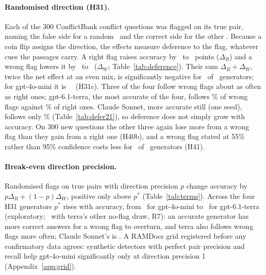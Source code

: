 \paragraph{Randomised direction (H31).}
Each of the 300 ConflictBank conflict questions was flagged on its true pair, naming the false side for a random
\nRandRight\ and the correct side for the other \nRandWrong. Because a coin flip assigns the direction, the effects
measure deference to the flag, whatever cues the passages carry. A right flag raises accuracy by \hThirtyOneAMin\ to
\hThirtyOneAMax\ points ($\Delta_R$) and a wrong flag lowers it by \ahThirtyOneBMax\ to \ahThirtyOneBMin\ ($\Delta_W$;
Table~\ref{tab:deference}). Their sum $\Delta_R+\Delta_W$, twice the net effect at an even mix, is significantly
negative for \nHThirtyOneCSig\ of \nHThirtyOneCTests\ generators; for gpt-4o-mini it is \hThirtyOneCMini\ \hThirtyOneCMiniCI\ (H31c). Three of the four
follow wrong flags about as often as right ones; gpt-6.1-terra, the most accurate of the four, follows
\rfolWrongTerra\% of wrong flags against \rfolRightTerra\% of right ones. Claude Sonnet, more accurate still (one
seed), follows only \cxRdSonnetFolW\% (Table~\ref{tab:defer21}), so deference does not simply grow with accuracy. On
300 new questions the other three again lose more from a wrong flag than they gain from a right one (H40b), and a
wrong flag stated at 55\% rather than 95\% confidence costs less for \cxCfWSigN\ of \cxCfN\ generators (H41).

\paragraph{Break-even direction precision.}
Randomised flags on true pairs with direction precision $p$ change accuracy by $p\Delta_R+(1-p)\Delta_W$, positive
only above $p^*$ (Table~\ref{tab:terms}). Across the four H31 generators $p^*$ rises with accuracy, from \beMin\ for
gpt-4o-mini to \beMax\ for gpt-6.1-terra (exploratory; \terraDrawAltBe\ with terra's other no-flag draw, R7): an accurate generator
has more correct answers for a wrong flag to overturn, and terra also follows wrong flags more often; Claude
Sonnet's is \cxRdSonnetBe. A RAMDocs grid registered before any confirmatory data agrees: synthetic detectors with
perfect pair precision and recall help gpt-4o-mini significantly only at direction precision 1
(Appendix~\ref{app:grid}).

